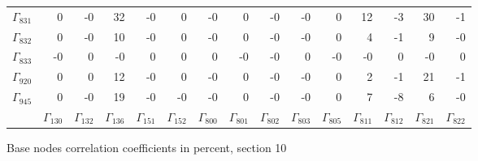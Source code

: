 {\begin{table}
\begin{center}
\begin{minipage}{\linewidth}
\begin{center}
\label{tab:tau:br-fit-corr9}%
\fi
\begin{envsmall}
\begin{center}
\renewcommand*{\arraystretch}{1.1}%
\begin{tabular}{rrrrrrrrrrrrrrr}
\hline
\( \Gamma_{831} \) &    0 &   -0 &   32 &   -0 &    0 &   -0 &    0 &   -0 &   -0 &    0 &   12 &   -3 &   30 &   -1 \\
\( \Gamma_{832} \) &    0 &   -0 &   10 &   -0 &    0 &   -0 &    0 &   -0 &   -0 &    0 &    4 &   -1 &    9 &   -0 \\
\( \Gamma_{833} \) &   -0 &    0 &   -0 &    0 &    0 &    0 &   -0 &   -0 &    0 &   -0 &   -0 &    0 &   -0 &    0 \\
\( \Gamma_{920} \) &    0 &    0 &   12 &   -0 &    0 &   -0 &    0 &   -0 &   -0 &    0 &    2 &   -1 &   21 &   -1 \\
\( \Gamma_{945} \) &    0 &   -0 &   19 &   -0 &   -0 &   -0 &    0 &   -0 &   -0 &    0 &    7 &   -8 &    6 &   -0 \\
 & \( \Gamma_{130} \) & \( \Gamma_{132} \) & \( \Gamma_{136} \) & \( \Gamma_{151} \) & \( \Gamma_{152} \) & \( \Gamma_{800} \) & \( \Gamma_{801} \) & \( \Gamma_{802} \) & \( \Gamma_{803} \) & \( \Gamma_{805} \) & \( \Gamma_{811} \) & \( \Gamma_{812} \) & \( \Gamma_{821} \) & \( \Gamma_{822} \)
\\\hline
\end{tabular}
\end{center}
\end{envsmall}
\ifhevea\else
\end{center}
\end{minipage}
\fi
\end{center}
\ifhevea\end{table}\fi
\ifhevea\begin{table}\fi%
\begin{center}
\ifhevea
\caption{Base nodes correlation coefficients in percent, section 10\label{tab:tau:br-fit-corr10}}%
\else
\begin{minipage}{\linewidth}
\begin{center}
\label{tab:tau:br-fit-corr10}%
\fi
\begin{envsmall}
\begin{center}

\end{center}
\end{envsmall}
\end{center}
\end{minipage}
\end{center}
\end{table}}
